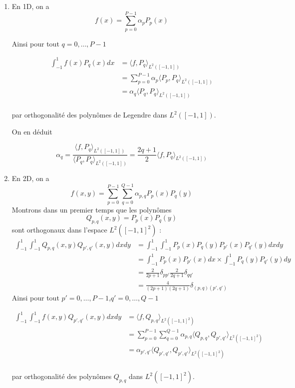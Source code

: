 \begin{enumerate}[label=\textbullet]
	\item En 1D, on a 
	$$f(x)=\sum_{p=0}^{P-1}\alpha_p P_p(x)$$
	
	Ainsi pour tout $q=0,\dots,P-1$
	
	\begin{align*}
		\int_{-1}^1 f(x)P_q(x)dx &= \langle f,P_q\rangle_{L^2([-1,1])} \\
		&=\sum_{p=0}^{P-1}\alpha_p \langle P_p,P_q\rangle_{L^2([-1,1])} \\
		&=\alpha_q \langle P_q,P_q\rangle_{L^2([-1,1])} \\
	\end{align*}
	
	par orthogonalité des polynômes de Legendre dans $L^2([-1,1])$. 
	
	On en déduit
	
	$$\alpha_q = \frac{\langle f,P_q\rangle_{L^2([-1,1])}}{\langle P_q,P_q\rangle_{L^2([-1,1])}}=\frac{2q+1}{2}\langle f,P_q\rangle_{L^2([-1,1])}$$
	\item En 2D, on a
	$$f(x,y)=\sum_{p=0}^{P-1}\sum_{q=0}^{Q-1}\alpha_{p,q}P_p(x)P_q(y)$$
	Montrons dans un premier temps que les polynômes
	$$Q_{p,q}(x,y)=P_p(x)P_q(y)$$
	sont orthogonaux dans l'espace $L^2([-1,1]^2)$ :
	\begin{align*}
		\int_{-1}^1 \int_{-1}^1 Q_{p,q}(x,y)Q_{p',q'}(x,y)dxdy&=\int_{-1}^1 \int_{-1}^1 P_p(x)P_q(y)P_{p'}(x)P_{q'}(y)dxdy \\
		&=\int_{-1}^1 P_p(x)P_{p'}(x)dx\times \int_{-1}^1 P_q(y)P_{q'}(y)dy \\
		&=\frac{2}{2p+1}\delta_{pp'}\frac{2}{2q+1}\delta_{qq'} \\
		&=\frac{4}{(2p+1)(2q+1)}\delta_{(p,q)(p',q')}
	\end{align*}
	Ainsi pour tout $p'=0,\dots,P-1$,$q'=0,\dots,Q-1$
	
	\begin{align*}
		\int_{-1}^1 \int_{-1}^1 f(x,y)Q_{p',q'}(x,y)dxdy &= \langle f,Q_{p,q}\rangle_{L^2([-1,1]^2)} \\
		&=\sum_{p=0}^{P-1}\sum_{q=0}^{Q-1}\alpha_{p,q} \langle Q_{p,q},Q_{p',q'}\rangle_{L^2([-1,1]^2)} \\
		&=\alpha_{p',q'} \langle Q_{p',q'},Q_{p',q'}\rangle_{L^2([-1,1]^2)} \\
	\end{align*}
	
	par orthogonalité des polynômes $Q_{p,q}$ dans $L^2([-1,1]^2)$. 
	

\end{enumerate}
